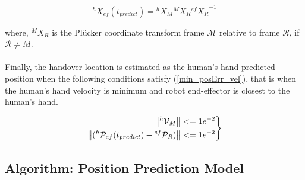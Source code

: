 \begin{equation}\label{X_ef_ht}
{}^{h}{X}_{ef}(t_{predict}) =  {}^{h}{X}_M  {}^{M}{X}_R {{}^{ef}{X}_R}^{-1}
\end{equation}

where, ${}^{M}{X}_R$ is the Pl\"ucker coordinate transform frame $\mathcal{M}$ relative to frame $\mathcal{R}$, if $\mathcal R \neq M$.

\paragraph*{}
Finally, the handover location is estimated as the human's hand predicted position when the following conditions satisfy (\ref{min_posErr_vel}), that is when the human's hand velocity is minimum and robot end-effector is closest to the human's hand.

\begin{equation}\label{min_posErr_vel}
\left.\begin{aligned}
\norm{{}^{h}\mathcal{\bar{V}}_{M}}& <= 1e^{-2} \\
\norm{({}^{h}\mathcal{P}_{ef}(t_{predict}) - {}^{ef}\mathcal{P}_{R})} & <= 1e^{-2}
\end{aligned}
\right\}
\end{equation}


\subsection{Algorithm: Position Prediction Model}

